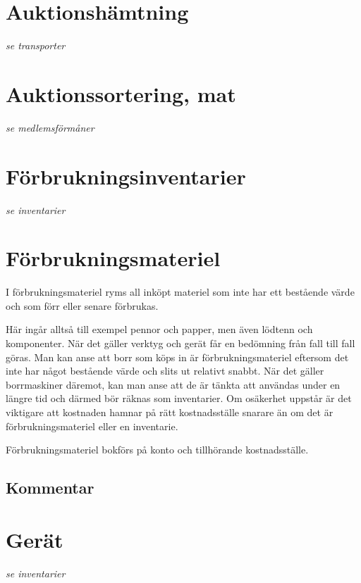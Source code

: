 
				\section{Auktionshämtning}
				\emph{se transporter}
			
				\section{Auktionssortering, mat}
				\emph{se medlemsförmåner}
			
				\section{Förbrukningsinventarier}
				\emph{se inventarier}
			
				\section{Förbrukningsmateriel}
				
				I förbrukningsmateriel ryms all inköpt materiel som inte har ett bestående värde och som förr eller senare förbrukas.
		
		Här ingår alltså till exempel pennor och papper, men även lödtenn och komponenter. När det gäller verktyg och gerät får en bedömning från fall till fall göras. Man kan anse att borr som köps in är förbrukningsmateriel eftersom det inte har något bestående värde och slits ut relativt snabbt. När det gäller borrmaskiner däremot, kan man anse att de är tänkta att användas under en längre tid och därmed bör räknas som inventarier. Om osäkerhet uppstår är det viktigare att kostnaden hamnar på rätt kostnadsställe snarare än om det är förbrukningsmateriel eller en inventarie.
			
				\begin{redovisning}
					Förbrukningsmateriel bokförs på konto  och tillhörande kostnadsställe.
				\end{redovisning}
			
				\begin{bokslut}
					
				\end{bokslut}
			
				\subsection{Kommentar}
				\emph{}
			
				\section{Gerät}
				\emph{se inventarier}
			
